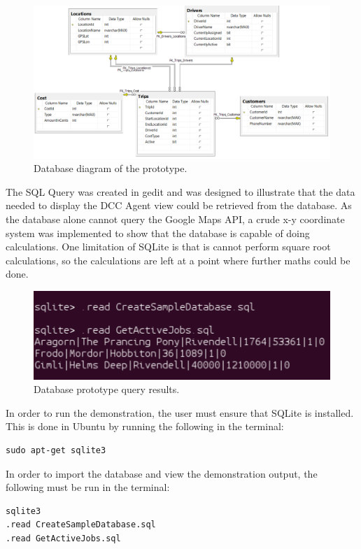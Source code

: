\documentclass[12pt]{article}
\begin{document}
\begin{figure}[ht]
\centering
\includegraphics[width=1\textwidth]{Database Diagram.png}
\caption{Database diagram of the prototype.}
\end{figure}

The SQL Query was created in gedit and was designed to illustrate that the data needed to display the DCC Agent view could be retrieved from the database. As the database alone cannot query the Google Maps API, a crude x-y coordinate system was implemented to show that the database is capable of doing calculations. One limitation of SQLite is that is cannot perform square root calculations, so the calculations are left at a point where further maths could be done. \\

\begin{figure}[ht]
\centering
\includegraphics[width=1\textwidth]{Query Results.png}
\caption{Database prototype query results.}
\end{figure}

In order to run the demonstration, the user must ensure that SQLite is installed. This is done in Ubuntu by running the following in the terminal:
\begin{verbatim}
sudo apt-get sqlite3
\end{verbatim}
In order to import the database and view the demonstration output, the following must be run in the terminal:
\begin{verbatim}
sqlite3
.read CreateSampleDatabase.sql
.read GetActiveJobs.sql
\end{verbatim}
\end{document}
